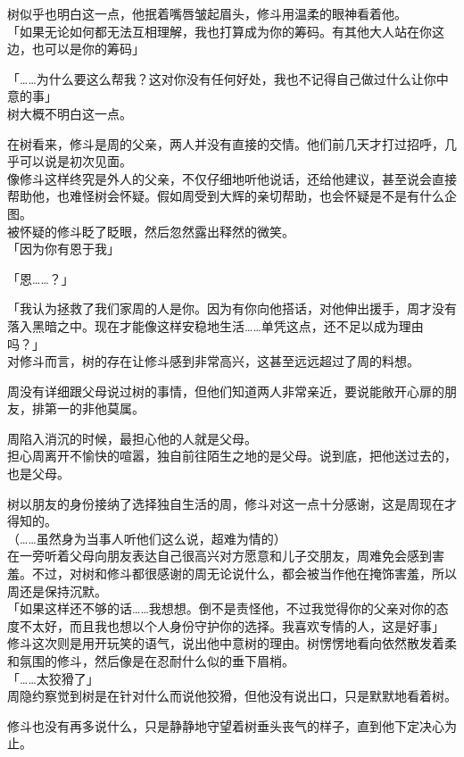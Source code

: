 树似乎也明白这一点，他抿着嘴唇皱起眉头，修斗用温柔的眼神看着他。\\

「如果无论如何都无法互相理解，我也打算成为你的筹码。有其他大人站在你这边，也可以是你的筹码」

「……为什么要这么帮我？这对你没有任何好处，我也不记得自己做过什么让你中意的事」\\

树大概不明白这一点。

在树看来，修斗是周的父亲，两人并没有直接的交情。他们前几天才打过招呼，几乎可以说是初次见面。\\

像修斗这样终究是外人的父亲，不仅仔细地听他说话，还给他建议，甚至说会直接帮助他，也难怪树会怀疑。假如周受到大辉的亲切帮助，也会怀疑是不是有什么企图。\\

被怀疑的修斗眨了眨眼，然后忽然露出释然的微笑。\\

「因为你有恩于我」

「恩……？」

「我认为拯救了我们家周的人是你。因为有你向他搭话，对他伸出援手，周才没有落入黑暗之中。现在才能像这样安稳地生活……单凭这点，还不足以成为理由吗？」\\

对修斗而言，树的存在让修斗感到非常高兴，这甚至远远超过了周的料想。

周没有详细跟父母说过树的事情，但他们知道两人非常亲近，要说能敞开心扉的朋友，排第一的非他莫属。

周陷入消沉的时候，最担心他的人就是父母。\\

担心周离开不愉快的喧嚣，独自前往陌生之地的是父母。说到底，把他送过去的，也是父母。

树以朋友的身份接纳了选择独自生活的周，修斗对这一点十分感谢，这是周现在才得知的。\\

（……虽然身为当事人听他们这么说，超难为情的）\\

在一旁听着父母向朋友表达自己很高兴对方愿意和儿子交朋友，周难免会感到害羞。不过，对树和修斗都很感谢的周无论说什么，都会被当作他在掩饰害羞，所以周还是保持沉默。\\

「如果这样还不够的话……我想想。倒不是责怪他，不过我觉得你的父亲对你的态度不太好，而且我也想以个人身份守护你的选择。我喜欢专情的人，这是好事」\\

修斗这次则是用开玩笑的语气，说出他中意树的理由。树愣愣地看向依然散发着柔和氛围的修斗，然后像是在忍耐什么似的垂下眉梢。\\

「……太狡猾了」\\

周隐约察觉到树是在针对什么而说他狡猾，但他没有说出口，只是默默地看着树。

修斗也没有再多说什么，只是静静地守望着树垂头丧气的样子，直到他下定决心为止。
